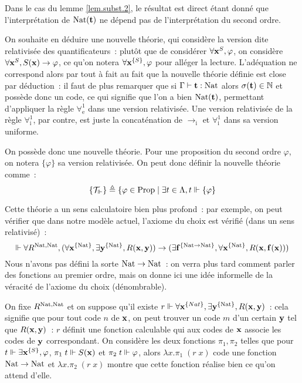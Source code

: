 \documentclass{article}
\begin{document}
Dans le cas du lemme \ref{lem.subst.2}, le résultat est direct étant donné que l'interprétation de $\mathrm{Nat}(\mathbf{t})$ ne dépend pas de l'interprétation du second ordre.

On souhaite en déduire une nouvelle théorie, qui considère la version dite relativisée des quantificateurs~: plutôt que de considérer $\forall \mathbf{x}^S, \varphi$, on considère $\forall \mathbf{x}^S, S(\mathbf{x}) \to \varphi$, ce qu'on notera $\forall \mathbf{x}^{\{S\}}, \varphi$ pour alléger la lecture. L'adéquation ne correspond alors par tout à fait au fait que la nouvelle théorie définie est close par déduction~: il faut de plus remarquer que si $\Gamma\vdash \mathbf{t} : \mathrm{Nat}$ alors $\sigma(\mathbf{t}) \in \mathbb{N}$ et possède donc un code, ce qui signifie que l'on a bien $\mathrm{Nat}(\mathbf{t})$, permettant d'appliquer la règle $\forall_\mathrm e^1$ dans une version relativisée. Une version relativisée de la règle $\forall_\mathrm i^1$, par contre, est juste la concaténation de $\to_\mathrm i$ et $\forall_\mathrm i^1$ dans sa version uniforme.

On possède donc une nouvelle théorie. Pour une proposition du second ordre $\varphi$, on notera $\{\varphi\}$ sa version relativisée. On peut donc définir la nouvelle théorie comme~:
\[\{\mathcal T_\Vdash\} \triangleq \{\varphi \in \mathrm{Prop}\mid \exists t \in \Lambda, t \Vdash\{\varphi\}\]

Cette théorie a un sens calculatoire bien plus profond~: par exemple, on peut vérifier que dans notre modèle actuel, l'axiome du choix est vérifié (dans un sens relativisé)~:
\[\Vdash \forall R^{\mathrm{Nat},\mathrm{Nat}},(\forall \mathbf{x}^{\{\mathrm{Nat}\}}, \exists \mathbf{y}^{\{\mathrm{Nat}\}}, R(\mathbf{x},\mathbf{y}))\to (\exists \mathbf{f}^{\{\mathrm{Nat}\to\mathrm{Nat}\}}, \forall \mathbf{x}^{\{\mathrm{Nat}\}}, R(\mathbf{x},\mathbf{f}(\mathbf{x})))\]
Nous n'avons pas défini la sorte $\mathrm{Nat}\to\mathrm{Nat}$~: on verra plus tard comment parler des fonctions au premier ordre, mais on donne ici une idée informelle de la véracité de l'axiome du choix (dénombrable).

On fixe $R^{\mathrm{Nat},\mathrm{Nat}}$ et on suppose qu'il existe $r\Vdash \forall \mathbf{x}^{\{Nat\}}, \exists \mathbf{y}^{\{\mathrm{Nat}\}}, R(\mathbf{x},\mathbf{y})$~: cela signifie que pour tout code $n$ de $\mathbf{x}$, on peut trouver un code $m$ d'un certain $\mathbf{y}$ tel que $R(\mathbf{x},\mathbf{y})$~: $r$ définit une fonction calculable qui aux codes de $\mathbf{x}$ associe les codes de $\mathbf{y}$ correspondant. On considère les deux fonctions $\pi_1,\pi_2$ telles que pour $t \Vdash \exists \mathbf{x}^{\{S\}}, \varphi$, $\pi_1\;t\Vdash S(\mathbf{x})$ et $\pi_2\;t\Vdash \varphi$, alors $\lambda x.\pi_1\;(r\;x)$ code une fonction $\mathrm{Nat}\to\mathrm{Nat}$ et $\lambda x.\pi_2\;(r\;x)$ montre que cette fonction réalise bien ce qu'on attend d'elle.
\end{document}

